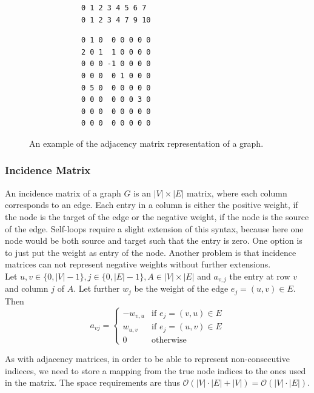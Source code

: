         \begin{figure}[htp]
         \begin{center}
         \begin{verbatim}
            0 1 2 3 4 5 6 7
            0 1 2 3 4 7 9 10
          \end{verbatim}
          \begin{verbatim}
            0 1 0  0 0 0 0 0
            2 0 1  1 0 0 0 0
            0 0 0 -1 0 0 0 0
            0 0 0  0 1 0 0 0
            0 5 0  0 0 0 0 0
            0 0 0  0 0 0 3 0
            0 0 0  0 0 0 0 0
            0 0 0  0 0 0 0 0
          \end{verbatim}
         \end{center}
         \caption{An example of the adjacency matrix representation of a graph.}
         \label{adm}
        \end{figure}
        
        \subsubsection*{Incidence Matrix}
        An incidence matrix of a graph $G$ is an $|V| \times |E|$ matrix, where each column corresponds to an edge. Each entry in a column is either the positive weight, if the node is the target of the edge or the negative weight, if the node is the source of the edge. Self-loops require a slight extension of this syntax, because here one node would be both source and target such that the entry is zero. One option is to just put the weight as entry of the node.  Another problem is that incidence matrices can not represent negative weights without further extensions. \\
        
        Let $u,v \in \{0, |V|-1\}, j \in \{0, |E|-1\}, A \in |V| \times |E|$ and $a_{v,j}$ the entry at row $v$ and column $j$ of $A$. Let further $w_j$ be the weight of the edge $e_j = (u,v) \in E$. Then 
        \[         a_{vj} = \begin{cases}
                     -w_{v,u} & \text{if } e_j = (v,u) \in E \\
                     w_{u,v} & \text{if } e_j = (u,v) \in E \\
                     0 & \text{otherwise}
                    \end{cases}
        \]
        
        As with adjacency matrices, in order to be able to represent non-consecutive indieces, we need to store a mapping from the true node indices to the ones used in the matrix.
        The space requirements are thus $\mathcal{O}(|V| \cdot |E| + |V|) = \mathcal{O}(|V| \cdot |E|)$. \\
        
